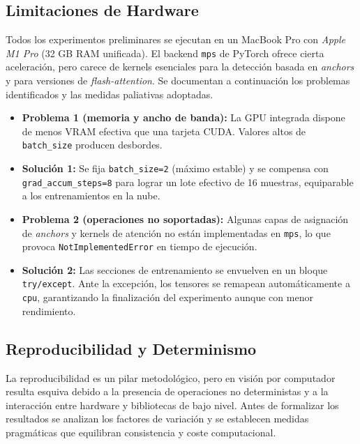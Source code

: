 \subsection{Limitaciones de Hardware}\label{ssec:hw_local}

Todos los experimentos preliminares se ejecutan en un MacBook Pro con \textit{Apple M1 Pro} (32 GB RAM unificada).
El backend \texttt{mps} de PyTorch ofrece cierta aceleración, pero carece de kernels esenciales para la detección basada en \emph{anchors} y para versiones de \emph{flash-attention}.
Se documentan a continuación los problemas identificados y las medidas paliativas adoptadas.

\begin{itemize}
   \item \textbf{Problema 1 (memoria y ancho de banda):}
   La GPU integrada dispone de menos VRAM efectiva que una tarjeta \textsc{CUDA}.
   Valores altos de \texttt{batch\_size} producen desbordes.
   \item \textbf{Solución 1:}
   Se fija \texttt{batch\_size=2} (máximo estable) y se compensa con \texttt{grad\_accum\_steps=8} para lograr un lote efectivo de 16 muestras, equiparable a los entrenamientos en la nube.
   \item \textbf{Problema 2 (operaciones no soportadas):}
   Algunas capas de asignación de \emph{anchors} y kernels de atención no están implementadas en \texttt{mps}, lo que provoca \texttt{NotImplementedError} en tiempo de ejecución.
   \item \textbf{Solución 2:}
   Las secciones de entrenamiento se envuelven en un bloque \texttt{try/except}.
   Ante la excepción, los tensores se remapean automáticamente a \texttt{cpu}, garantizando la finalización del experimento aunque con menor rendimiento.
\end{itemize}

\subsection{Reproducibilidad y Determinismo}

La reproducibilidad es un pilar metodológico, pero en visión por computador resulta esquiva debido a la presencia de operaciones no deterministas y a la interacción entre hardware y bibliotecas de bajo nivel.
Antes de formalizar los resultados se analizan los factores de variación y se establecen medidas pragmáticas que equilibran consistencia y coste computacional.

